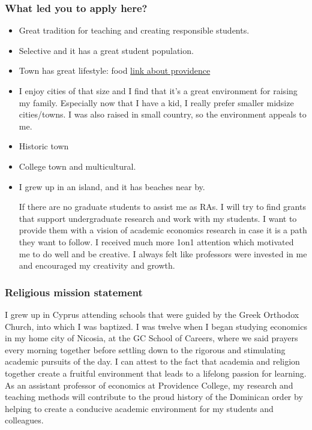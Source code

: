 \documentclass[12pt]{article}
\theoremstyle{plain}
\theoremstyle{plain}
\theoremstyle{plain}
\theoremstyle{plain}
\theoremstyle{plain}
\theoremstyle{plain}
\begin{document}
\subsubsection{What led you to apply here?}
\label{sec:org48c7213}
\begin{itemize}
\item Great tradition for teaching and creating responsible students.
\item Selective and it has a great student population.
\item Town has great lifestyle: food \href{https://www.sparefoot.com/moving/moving-to-providence-ri/20-things-you-need-to-know-before-moving-to-providence/}{link about providence}
\item I enjoy cities of that size and I find that it's a great environment for raising my family.
Especially now that I have a kid, I really prefer smaller midsize cities/towns.
I was also raised in small country, so the environment appeals to me.
\item Historic town
\item College town and multicultural.
\item I grew up in an island, and it has beaches near by.

If there are no graduate students to assist me as RAs.
I will try to find grants that support undergraduate research and work with my students.
I want to provide them with a vision of academic economics research in case it is a path they want to follow.
I received much more 1on1 attention which motivated me to do well and be creative. I always felt like professors were invested in me and encouraged my creativity and growth.
\end{itemize}




\subsubsection{Religious mission statement}
\label{sec:org0f2e905}
I grew up in Cyprus attending schools that were guided by the Greek Orthodox Church,
into which I was baptized.
I was twelve when I began studying economics in my home city of Nicosia, at
the GC School of Careers, where we said prayers every morning together
before settling down to the rigorous and stimulating academic pursuits of
the day. I can attest to the fact that academia and religion together create
a fruitful environment that leads to a lifelong passion for learning. As an
assistant professor of economics at Providence College, my research and
teaching methods will contribute to the proud history of the Dominican order
by helping to create a conducive academic environment for my students and
colleagues.
\end{document}

